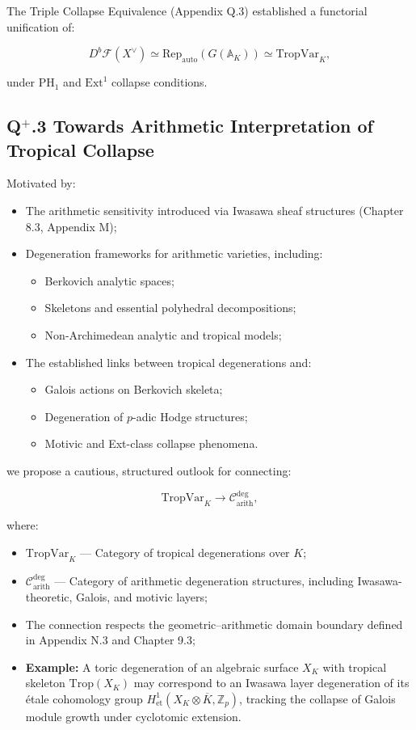 \documentclass[11pt]{article}
\begin{document}
The Triple Collapse Equivalence (Appendix Q.3) established a functorial unification of:

\[
D^b\mathcal{F}(X^\vee) \simeq \mathrm{Rep}_{\mathrm{auto}}(G(\mathbb{A}_K)) \simeq \mathrm{TropVar}_K,
\]

under $\mathrm{PH}_1$ and $\mathrm{Ext}^1$ collapse conditions.

\subsection*{Q$^{+}$.3 Towards Arithmetic Interpretation of Tropical Collapse}

Motivated by:

\begin{itemize}
    \item The arithmetic sensitivity introduced via Iwasawa sheaf structures (Chapter 8.3, Appendix M);
    \item Degeneration frameworks for arithmetic varieties, including:
    \begin{itemize}
        \item Berkovich analytic spaces;
        \item Skeletons and essential polyhedral decompositions;
        \item Non-Archimedean analytic and tropical models;
    \end{itemize}
    \item The established links between tropical degenerations and:
    \begin{itemize}
        \item Galois actions on Berkovich skeleta;
        \item Degeneration of $p$-adic Hodge structures;
        \item Motivic and Ext-class collapse phenomena.
    \end{itemize}
\end{itemize}

we propose a cautious, structured outlook for connecting:

\[
\mathrm{TropVar}_K \longrightarrow \mathcal{C}_{\mathrm{arith}}^{\mathrm{deg}},
\]

where:

\begin{itemize}
    \item \( \mathrm{TropVar}_K \) — Category of tropical degenerations over \( K \);
    \item \( \mathcal{C}_{\mathrm{arith}}^{\mathrm{deg}} \) — Category of arithmetic degeneration structures, including Iwasawa-theoretic, Galois, and motivic layers;
    \item The connection respects the geometric–arithmetic domain boundary defined in Appendix N.3 and Chapter 9.3;
    \item \textbf{Example:} A toric degeneration of an algebraic surface $X_K$ with tropical skeleton $\mathrm{Trop}(X_K)$ may correspond to an Iwasawa layer degeneration of its étale cohomology group $H^1_{\mathrm{et}}(X_K \otimes \overline{K}, \mathbb{Z}_p)$, tracking the collapse of Galois module growth under cyclotomic extension.
\end{itemize}
\end{document}
